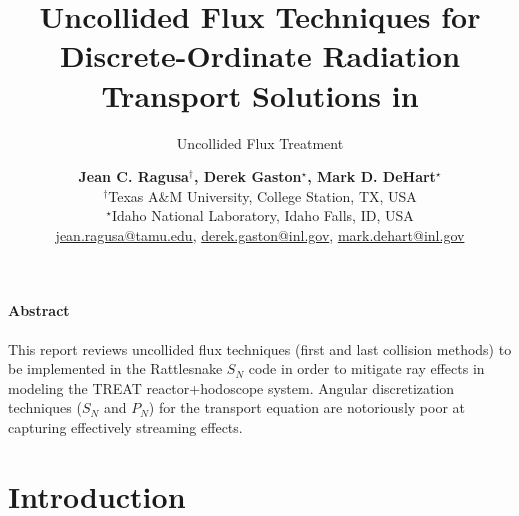 \documentclass[12pt]{scrartcl}
\title{Uncollided Flux Techniques for Discrete-Ordinate Radiation Transport Solutions in \rattlesnake}
\subtitle{Uncollided Flux Treatment \rattlesnake}
\author{ \normalsize
  \textbf{Jean C. Ragusa$^\dagger$, Derek Gaston$^\star$, Mark D. DeHart$^\star$} \\
 \normalsize $^\dagger$Texas A\&M University, College Station, TX, USA\\
 \normalsize $^\star$Idaho National Laboratory, Idaho Falls, ID, USA\\
 \normalsize \href{jean.ragusa@tamu.edu}{jean.ragusa@tamu.edu}, \href{derek.gaston@inl.gov}{derek.gaston@inl.gov}, \href{mark.dehart@inl.gov}{mark.dehart@inl.gov}
}
\begin{document}
\maketitle
\tableofcontents
{}

\paragraph*{Abstract}

This report reviews uncollided flux techniques (first and last collision methods) to be implemented in 
the Rattlesnake $S_N$ code in order to mitigate ray effects in modeling the TREAT reactor+hodoscope system. Angular
discretization techniques ($S_N$ and $P_N$) for the transport equation are notoriously poor at capturing effectively
streaming effects. 

\pagebreak

\section{Introduction}
\end{document}

